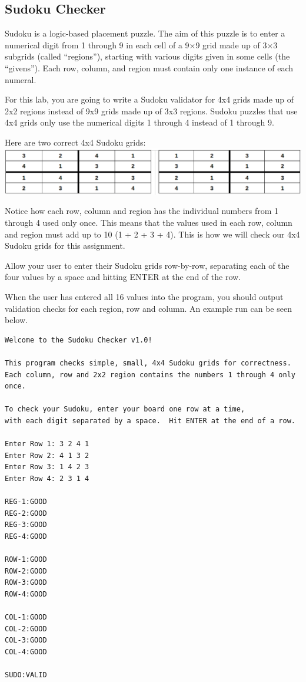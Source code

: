 \vspace{-0.1in}
\subsection*{Sudoku Checker}
\vspace{-0.05in}
Sudoku is a logic-based placement puzzle. The aim of this puzzle is to enter a numerical digit from 1 through 9 in each cell of a 9×9 grid made up of 3×3 subgrids (called ``regions''), starting with various digits given in some cells (the ``givens''). Each row, column, and region must contain only one instance of each numeral.

\noindent For this lab, you are going to write a Sudoku validator for 4x4 grids made up of 2x2 regions instead of 9x9 grids made up of 3x3 regions.  Sudoku puzzles that use 4x4 grids only use the numerical digits 1 through 4 instead of 1 through 9.

\noindent Here are two correct 4x4 Sudoku grids:\\
\includegraphics[scale=0.3]{grids}

\noindent Notice how each row, column and region has the individual numbers from 1 through 4 used only once.  This means that the values used in each row, column and region must add up to 10 (1 + 2 + 3 + 4).  This is how we will check our 4x4 Sudoku grids for this assignment.

\noindent Allow your user to enter their Sudoku grids row-by-row, separating each of the four values by a space and hitting ENTER at the end of the row.

\noindent When the user has entered all 16 values into the program, you should output validation checks for each region, row and column.  An example run can be seen below.
\begin{verbatim}
Welcome to the Sudoku Checker v1.0!

This program checks simple, small, 4x4 Sudoku grids for correctness. 
Each column, row and 2x2 region contains the numbers 1 through 4 only once.

To check your Sudoku, enter your board one row at a time, 
with each digit separated by a space.  Hit ENTER at the end of a row.

Enter Row 1: 3 2 4 1
Enter Row 2: 4 1 3 2
Enter Row 3: 1 4 2 3
Enter Row 4: 2 3 1 4

REG-1:GOOD
REG-2:GOOD
REG-3:GOOD
REG-4:GOOD

ROW-1:GOOD
ROW-2:GOOD
ROW-3:GOOD
ROW-4:GOOD

COL-1:GOOD
COL-2:GOOD
COL-3:GOOD
COL-4:GOOD

SUDO:VALID
\end{verbatim}

